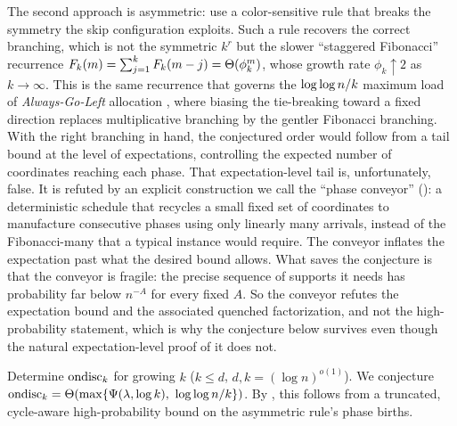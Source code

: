 The second approach is asymmetric: use a color-sensitive rule that breaks the symmetry the skip configuration exploits. Such
a rule recovers the correct branching, which is not the symmetric $k^{r}$ but the slower ``staggered Fibonacci'' recurrence
$F_k(m)=\sum_{j=1}^{k}F_k(m-j)=\Theta(\phi_k^{m})$, whose growth rate $\phi_k\uparrow2$ as $k\to\infty$. This is the same
recurrence that governs the $\log\log n/k$ maximum load of \emph{Always-Go-Left} allocation \cite{BCSV2006}, where biasing
the tie-breaking toward a fixed direction replaces multiplicative branching by the gentler Fibonacci branching. With the
right branching in hand, the conjectured order would follow from a tail bound at the level of expectations, controlling the
expected number of coordinates reaching each phase. That expectation-level tail is, unfortunately, false. It is refuted by an
explicit construction we call the ``phase conveyor'' (): a deterministic schedule that recycles a small fixed
set of coordinates to manufacture consecutive phases using only linearly many arrivals, instead of the Fibonacci-many that a
typical instance would require. The conveyor inflates the expectation past what the desired bound allows. What saves the
conjecture is that the conveyor is fragile: the precise sequence of supports it needs has probability far below $n^{-A}$ for
every fixed $A$. So the conveyor refutes the expectation bound and the associated quenched factorization, and not the
high-probability statement, which is why the conjecture below survives even though the natural expectation-level proof of it
does not.

\begin{problem}\label{prob:growing}
Determine $\mathrm{ondisc}_k$ for growing $k$ ($k\le d$, $d,k=(\log n)^{o(1)}$). We conjecture
$\mathrm{ondisc}_k=\Theta(\max\{\Psi(\lambda,\log k),\ \log\log n/k\})$. By , this follows from a truncated, cycle-aware
high-probability bound on the asymmetric rule's phase births.
\end{problem}
